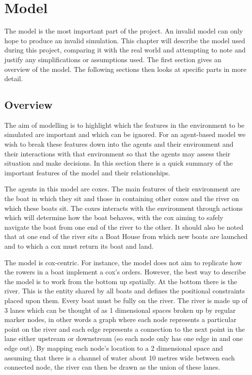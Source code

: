 \chapter{Model}
  The model is the most important part of the project. An invalid model can only hope to produce an invalid simulation. This chapter will describe the model used during this project, comparing it with the real world and attempting to note and justify any simplifications or assumptions used. The first section gives an overview of the model. The following sections then looks at specific parts in more detail.
  
  \section{Overview}
    The aim of modelling is to highlight which the features in the environment to be simulated are important and which can be ignored\cite{Sterling2009}. For an agent-based model we wish to break these features down into the agents and their environment and their interactions with that environment so that the agents may assess their situation and make decisions\cite{Bonabeau2002}. In this section there is a quick summary of the important features of the model and their relationships.
    
    The agents in this model are coxes. The main features of their environment are the boat in which they sit and those in containing other coxes and the river on which these boats sit. The coxes interacts with the environment through actions which will determine how the boat behaves, with the cox aiming to safely navigate the boat from one end of the river to the other. It should also be noted that at one end of the river sits a Boat House from which new boats are launched and to which a cox must return its boat and land.
    
    The model is cox-centric. For instance, the model does not aim to replicate how the rowers in a boat implement a cox's orders. However, the best way to describe the model is to work from the bottom up spatially. At the bottom there is the river. This is the entity shared by all boats and defines the positional constraints placed upon them. Every boat must be fully on the river. The river is made up of 3 lanes which can be thought of as 1 dimensional spaces broken up by regular marker nodes, in other words a graph where each node represents a particular point on the river and each edge represents a connection to the next point in the lane either upstream or downstream (so each node only has one edge in and one edge out). By mapping each node's location to a 2 dimensional space and assuming that there is a channel of water about 10 metres wide between each connected node, the river can then be drawn as the union of these lanes.
    
